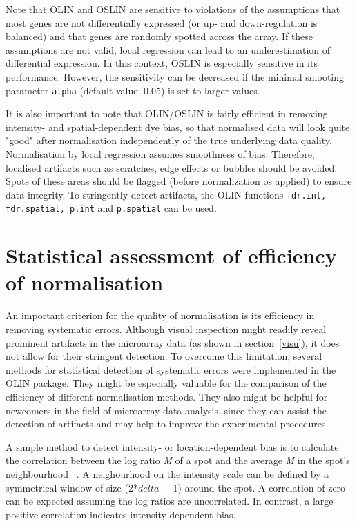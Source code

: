 \documentclass[a4paper,11pt]{article}
\begin{document}
Note that OLIN and OSLIN
are sensitive to violations of the assumptions that
 most genes are not differentially expressed (or up- and down-regulation
is balanced) and that genes are randomly spotted across the array. 
If these assumptions are not valid, local
regression can lead to an underestimation of differential expression.  
In this context,  OSLIN is especially sensitive in its performance. However, the
sensitivity can be decreased if the minimal smooting parameter \texttt{alpha} (default value: 0.05)
 is set to larger values. 
 

It is also important to note that OLIN/OSLIN is fairly efficient in removing intensity- and spatial-dependent dye bias, so that normalised  data will look quite "good" after normalisation independently of the true underlying data quality. Normalisation by local regression assumes smoothness of bias. Therefore, localised artifacts such as scratches, edge effects or bubbles should be avoided. Spots of these areas should be flagged (before normalization os applied) to ensure data integrity. To stringently detect artifacts, the OLIN functions \texttt{fdr.int, fdr.spatial, p.int} and \texttt{p.spatial} can be used.







\section{Statistical assessment of efficiency of normalisation}
\label{stats}
An important criterion for the quality of normalisation is its efficiency in 
removing systematic errors. Although visual inspection might readily reveal prominent
artifacts in the microarray data (as shown in section~\ref{visu}), it does not allow for their stringent 
detection. To overcome this limitation, several methods for statistical detection of 
systematic errors were implemented in the OLIN package. They might be especially valuable
for the comparison of the efficiency of different normalisation methods. They also might 
be helpful for newcomers in the field of microarray data analysis, since they can assist the
detection of artifacts and may help to improve the experimental procedures.

A simple method to detect intensity- or location-dependent  bias is to calculate the 
correlation between the log ratio \emph{M} of a spot and the average \emph{M} in the spot's 
neighbourhood ~\cite{jo}. A neighourhood on the intensity scale can be defined by a symmetrical
window of size (2*$delta$ + 1) around the spot. A correlation of zero can be expected assuming
the log ratios are uncorrelated. In contrast, a large positive correlation indicates intensity-dependent
 bias.
\end{document}
